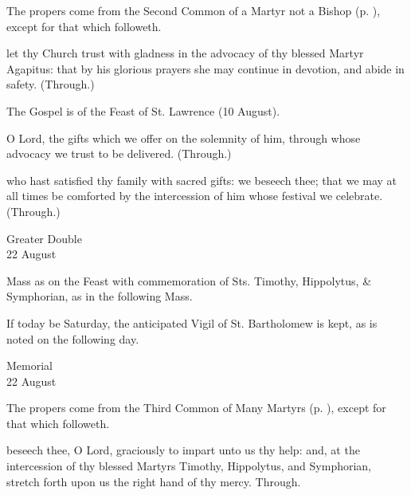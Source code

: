 \begin{rubric}
	The propers come from the Second Common of a Martyr not a Bishop (p. \pageref{CommonMartyrNotBishopII}), except for that which followeth.
\end{rubric}

\collect
{} let thy Church trust with gladness in the advocacy of thy blessed Martyr Agapitus: that by his glorious prayers she may continue in devotion, and abide in safety. (Through.)

\begin{rubric}
	The Gospel is of the Feast of St. Lawrence (10 August).
\end{rubric}

\secret
{} O Lord, the gifts which we offer on the solemnity of him, through whose advocacy we trust to be delivered. (Through.)

\postcommunion
{} who hast satisfied thy family with sacred gifts: we beseech thee; that we may at all times be comforted by the intercession of him whose festival we celebrate. (Through.)

\begin{inhead}
    {Greater Double\\
22 August}
\end{inhead}
\begin{rubric}
	Mass as on the Feast with commemoration of Sts. Timothy, Hippolytus, \& Symphorian, as in the following Mass.
\end{rubric}
\begin{rubric}
	If today be Saturday, the anticipated Vigil of St. Bartholomew is kept, as is noted on the following day.
\end{rubric}

\begin{inhead}
    {Memorial\\
22 August}
\end{inhead}

\begin{rubric}
	The propers come from the Third Common of Many Martyrs (p. \pageref{CommonMartyrsIII}), except for that which followeth.
\end{rubric}

\collect
{} beseech thee, O Lord, graciously to impart unto us thy help: and, at the intercession of thy blessed Martyrs Timothy, Hippolytus, and Symphorian, stretch forth upon us the right hand of thy mercy. Through.

